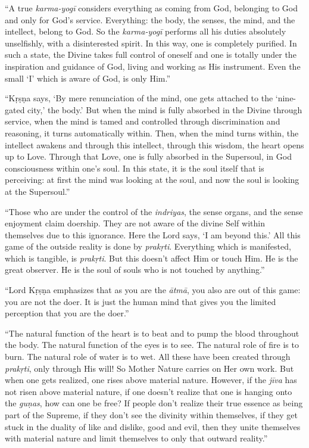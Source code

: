 \documentclass[12pt, twoside, openright]{memoir}
\begin{document}
\enquote{A true \textit{karma-yogī} considers everything as coming from God, belonging to God and only for God’s service. Everything: the body, the senses, the mind, and the intellect, belong to God. So the \textit{karma-yogī} performs all his duties absolutely unselfishly, with a disinterested spirit. In this way, one is completely purified. In such a state, the Divine takes full control of oneself and one is totally under the inspiration and guidance of God, living and working as His instrument. Even the small \enquote{I} which is aware of God, is only Him.}

\enquote{Kṛṣṇa says, \enquote{By mere renunciation of the mind, one gets attached to the ‘nine-gated city,’ the body.} But when the mind is fully absorbed in the Divine through service, when the mind is tamed and controlled through discrimination and reasoning, it turns automatically within. Then, when the mind turns within, the intellect awakens and through this intellect, through this wisdom, the heart opens up to Love. Through that Love, one is fully absorbed in the Supersoul, in God consciousness within one’s soul. In this state, it is the soul itself that is perceiving: at first the mind was looking at the soul, and now the soul is looking at the Supersoul.}

\enquote{Those who are under the control of the \textit{indriyas}, the sense organs, and the sense enjoyment claim doership. They are not aware of the divine Self within themselves due to this ignorance. Here the Lord says, \enquote{I am beyond this.} All this game of the outside reality is done by \textit{prakṛti}. Everything which is manifested, which is tangible, is \textit{prakṛti}. But this doesn’t affect Him or touch Him. He is the great observer. He is the soul of souls who is not touched by anything.}

\enquote{Lord Kṛṣṇa emphasizes that as you are the \textit{ātmā}, you also are out of this game: you are not the doer. It is just the human mind that gives you the limited perception that you are the doer.}

\enquote{The natural function of the heart is to beat and to pump the blood throughout the body. The natural function of the eyes is to see. The natural role of fire is to burn. The natural role of water is to wet. All these have been created through \textit{prakṛti}, only through His will! So Mother Nature carries on Her own work. But when one gets realized, one rises above material nature. However, if the \textit{jīva} has not risen above material nature, if one doesn’t realize that one is hanging onto the \textit{guṇas}, how can one be free? If people don’t realize their true essence as being part of the Supreme, if they don’t see the divinity within themselves, if they get stuck in the duality of like and dislike, good and evil, then they unite themselves with material nature and limit themselves to only that outward reality.}
\end{document}
